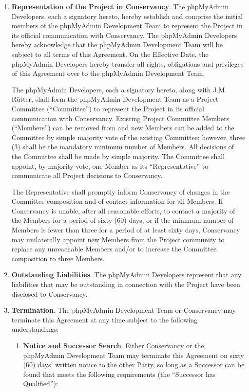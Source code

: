 \documentclass[letterpaper,11pt]{article}
\newcommand{\signatories}{phpMyAdmin Developers\xspace}
\newcommand{\leadershipbody}{phpMyAdmin Development Team\xspace}
\begin{document}
\begin{enumerate}[label=\arabic*.,ref=\S~\arabic*]
\item \textbf{Representation of the Project in Conservancy}. \label{Representation}The
\signatories, each a signatory hereto, hereby establish and comprise
the initial members of the \leadershipbody
to represent the Project in its official communication with Conservancy.
The \signatories hereby acknowledge that the \leadershipbody
will be subject to all terms of this Agreement.
On the Effective Date, the \signatories hereby transfer all
rights, obligations and privileges of this Agreement over to the
\leadershipbody.

The \signatories,
each a signatory hereto, along with J.M. Rütter, shall form
the \leadershipbody as a Project Committee (``Committee'')
to represent the Project in its official communication with Conservancy.
Existing Project Committee Members (``Members'') can be removed
from and new Members can be added to the Committee by simple majority
vote of the existing Committee; however, three (3) shall be the mandatory
minimum number of Members. All decisions of the Committee shall be
made by simple majority. The Committee shall appoint, by majority
vote, one Member as its ``Representative'' to communicate all Project
decisions to Conservancy.


The Representative shall promptly inform Conservancy of changes in
the Committee composition and of contact information for all Members.
If Conservancy is unable, after all reasonable efforts, to contact
a majority of the Members for a period of sixty (60) days, or if the
minimum number of Members is fewer than three for a period of at least
sixty days, Conservancy may unilaterally appoint new Members from
the Project community to replace any unreachable Members and/or to
increase the Committee composition to three Members.

\item \textbf{Outstanding Liabilities}. The \signatories represent
that any liabilities that may be outstanding in connection with the
Project have been disclosed to Conservancy. 
\item \textbf{Termination}. \label{Termination} The \leadershipbody or Conservancy
may terminate this Agreement at any time subject to the following
understandings:


\begin{enumerate}[label=\alph*.,ref=\theenumi(\arabic*)]

\item \textbf{Notice and Successor Search}. Either Conservancy or the \leadershipbody
may terminate this Agreement on sixty (60) days' written notice to
the other Party, so long as a Successor can be found that meets the
following requirements (the ``Successor has Qualified''):



\end{enumerate}
\end{enumerate}
\end{document}

